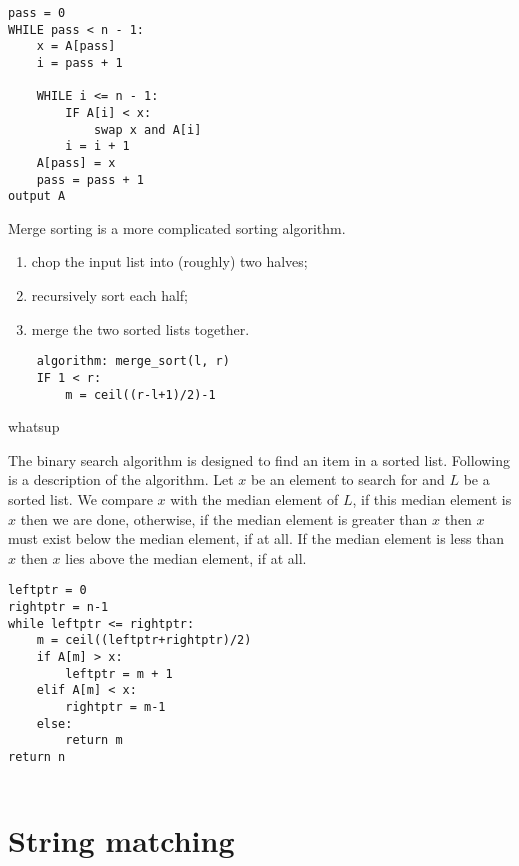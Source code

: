 \begin{lstlisting}[caption=Selection sort]
pass = 0
WHILE pass < n - 1:
    x = A[pass]
    i = pass + 1
    
    WHILE i <= n - 1:
        IF A[i] < x:
            swap x and A[i]
        i = i + 1
    A[pass] = x
    pass = pass + 1
output A
\end{lstlisting}

\begin{definition}
    Merge sorting is a more complicated sorting algorithm.
    \begin{enumerate}
        \item chop the input list into (roughly) two halves;
        \item recursively sort each half;
        \item merge the two sorted lists together.
    \end{enumerate}
\end{definition}


\begin{algorithm}
    \begin{lstlisting}
    algorithm: merge_sort(l, r)
    IF 1 < r:
        m = ceil((r-l+1)/2)-1
    \end{lstlisting}
    \caption{whatsup}
\end{algorithm}

\begin{definition}
    The binary search algorithm is designed to find an item in a sorted list. Following is a description of the algorithm.
    Let $x$ be an element to search for and $L$ be a sorted list. We compare $x$ with the median element of $L$, if this median element is $x$ then we are done, otherwise, if the median element is greater than $x$ then $x$ must exist below the median element, if at all. If the median element is less than $x$ then $x$ lies above the median element, if at all.
    

\end{definition}

\begin{lstlisting}[caption=Binary search.]
leftptr = 0
rightptr = n-1
while leftptr <= rightptr:
    m = ceil((leftptr+rightptr)/2)
    if A[m] > x:
        leftptr = m + 1
    elif A[m] < x:
        rightptr = m-1
    else:
        return m
return n
        
\end{lstlisting}


\section{String matching}


